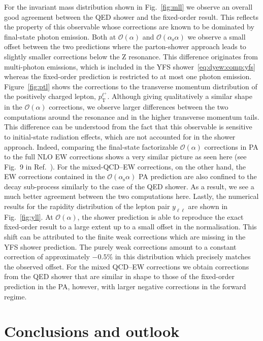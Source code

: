 \documentclass[11pt]{cernrep}
\newcommand{\order}{\ensuremath{\mathcal{O}}}
\newcommand{\alphas}{\ensuremath{\alpha_\mathrm{s}}}
\newcommand{\rT}{\ensuremath{\mathrm{T}}} %
\DeclareRobustCommand{\PZ}{{\ensuremath{\mathrm{Z}}}}
\DeclareRobustCommand{\Pl}{{\ensuremath{\ell}}}
\DeclareRobustCommand{\Plp}{{\ensuremath{\ell^+}}}
\begin{document}
For the invariant mass distribution shown in Fig.~\ref{fig:mll} we observe an overall good agreement between the QED shower and the fixed-order result.
This reflects the property of this observable whose corrections are known to be dominated by final-state photon emission.
Both at $\order(\alpha)$ and $\order(\alphas\alpha)$ we observe a small offset between the two predictions where the parton-shower approach leads to slightly smaller corrections below the $\PZ$ resonance. 
This difference originates from multi-photon emissions, which is included in the YFS shower~\eqref{eq:dyew:comp:yfs} whereas the fixed-order prediction is restricted to at most one photon emission.
Figure~\ref{fig:ptl} shows the corrections to the transverse momentum distribution of the positively charged lepton, $p_\rT^\Plp$.
Although giving qualitatively a similar shape in the $\order(\alpha)$ corrections, we observe larger differences between the two computations around the resonance and in the higher transverse momentum tails.
This difference can be understood from the fact that this observable is sensitive to initial-state radiation effects, which are not accounted for in the shower approach.
Indeed, comparing the final-state factorizable $\order(\alpha)$ corrections in PA to the full NLO EW corrections shows a very similar picture as seen here (see Fig.~9 in Ref.~\cite{Dittmaier:2014qza}).
For the mixed-QCD--EW corrections, on the other hand, the EW corrections contained in the $\order(\alphas\alpha)$ PA prediction are also confined to the decay sub-process similarly to the case of the QED shower.
As a result, we see a much better agreement between the two computations here.
Lastly, the numerical results for the rapidity distribution of the lepton pair $y_{\Pl\Pl}$ are shown in Fig.~\ref{fig:yll}.
At $\order(\alpha)$, the shower prediction is able to reproduce the exact fixed-order result to a large extent up to a small offset in the normalisation.
This shift can be attributed to the finite weak corrections which are missing in the YFS shower prediction.
The purely weak corrections amount to a constant correction of approximately $-0.5\%$ in this distribution which precisely matches the observed offset. 
For the mixed QCD--EW corrections we obtain corrections from the QED shower that are similar in shape to those of the fixed-order prediction in the PA, however, with larger negative corrections in the forward regime.




\section{Conclusions and outlook}
\label{sec:dyew:conclusions}
\end{document}
